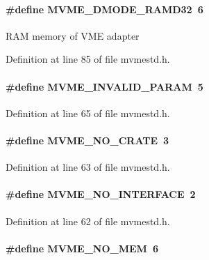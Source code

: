 \paragraph[{MVME\_\-DMODE\_\-RAMD32}]{\setlength{\rightskip}{0pt plus 5cm}\#define MVME\_\-DMODE\_\-RAMD32~6}\hfill\label{group__mvmestdinclude_gaf33ae8d3aca31ae4679f0a12647071b8}
RAM memory of VME adapter 

Definition at line 85 of file mvmestd.h.
\paragraph[{MVME\_\-INVALID\_\-PARAM}]{\setlength{\rightskip}{0pt plus 5cm}\#define MVME\_\-INVALID\_\-PARAM~5}\hfill\label{group__mvmestdinclude_ga7b4c0f280cd16a612cdbb7b8de7ef7f7}


Definition at line 65 of file mvmestd.h.
\paragraph[{MVME\_\-NO\_\-CRATE}]{\setlength{\rightskip}{0pt plus 5cm}\#define MVME\_\-NO\_\-CRATE~3}\hfill\label{group__mvmestdinclude_gaaec0f6d5a127f40010a889f7da83ae98}


Definition at line 63 of file mvmestd.h.
\paragraph[{MVME\_\-NO\_\-INTERFACE}]{\setlength{\rightskip}{0pt plus 5cm}\#define MVME\_\-NO\_\-INTERFACE~2}\hfill\label{group__mvmestdinclude_ga2d9377a6c82702226dbcebf66f30d636}


Definition at line 62 of file mvmestd.h.
\paragraph[{MVME\_\-NO\_\-MEM}]{\setlength{\rightskip}{0pt plus 5cm}\#define MVME\_\-NO\_\-MEM~6}\hfill\label{group__mvmestdinclude_ga1a17e560c1bd89c378077963e2521437}


